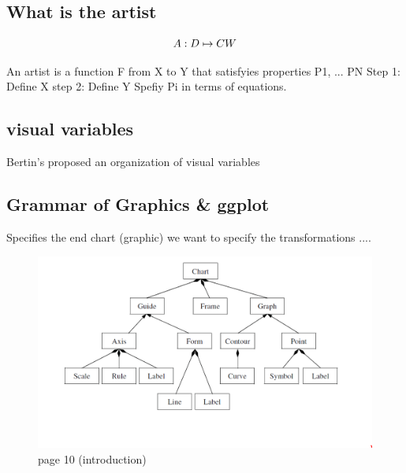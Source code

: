 \documentclass[letterpaper,onecolumn,titlepage]{Ythesis}
\begin{document}
\subsection{What is the artist}
\begin{equation}
A: D \mapsto CW\\
\end{equation}

An artist is a function F from X to Y
that satisfyies properties P1, ... PN
Step 1: Define X
step 2: Define Y
Spefiy Pi in terms of equations.

\subsection{visual variables}
Bertin's proposed an organization of visual variables \cite{bertinIIPropertiesGraphic2011} 


\subsection{Grammar of Graphics \& ggplot}
Specifies the end chart (graphic)
we want to specify the transformations ....
\begin{figure}
    \includegraphics{figures/intro/grammar_chart_composition.png}
    \caption{page 10 (introduction)}
\end{figure}
\end{document}

